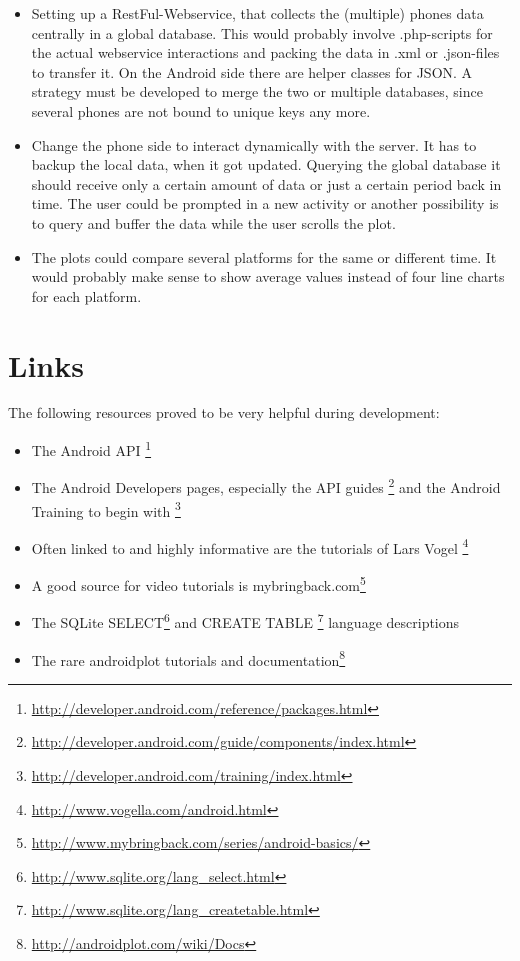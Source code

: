 \documentclass[11pt,oneside,a4paper]{scrartcl}
\begin{document}
\begin{itemize}
\item
Setting up a RestFul-Webservice, that collects the (multiple) phones data centrally in a global database. This would probably involve .php-scripts for the actual webservice interactions and packing the data in .xml or .json-files to transfer it. On the Android side there are helper classes for JSON.
A strategy must be developed to merge the two or multiple databases, since several phones are not bound to unique keys any more. 

\item
Change the phone side to interact dynamically with the server. It has to backup the local data, when it got updated. Querying the global database it should receive only a certain amount of data or just a certain period back in time. The user could be prompted in a new activity or another possibility is to query and buffer the data while the user scrolls the plot.

\item
The plots could compare several platforms for the same or different time. It would probably make sense to show average values instead of four line charts for each platform.

\end{itemize}

\section{Links}
The following resources proved to be very helpful during development:

\begin{itemize}\itemsep0pt
\item The Android API \footnote{\url{http://developer.android.com/reference/packages.html}}
\item The Android Developers pages, especially the API guides \footnote{\url{http://developer.android.com/guide/components/index.html}} and the Android Training to begin with \footnote{\url{http://developer.android.com/training/index.html}}
\item Often linked to and highly informative are the tutorials of Lars Vogel \footnote{\url{http://www.vogella.com/android.html}}
\item A good source for video tutorials is mybringback.com\footnote{\url{http://www.mybringback.com/series/android-basics/}}
\item The SQLite SELECT\footnote{\url{http://www.sqlite.org/lang_select.html}} and CREATE TABLE \footnote{\url{http://www.sqlite.org/lang_createtable.html}} language descriptions
\item The rare androidplot tutorials and documentation\footnote{\url{http://androidplot.com/wiki/Docs}}

\end{itemize}


\end{document}
